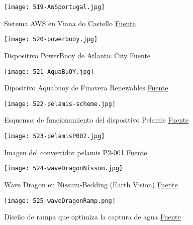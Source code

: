 \begin{figure}
\centering
\texttt{[image: 519-AWSportugal.jpg]}
\caption[Sistema AWS en Viana do Castello]{Sistema AWS en Viana do Castello \href{www.awsocean.com}{Fuente}}
\label{fig:AWSportugal}
\end{figure}

\begin{figure}
\centering
\texttt{[image: 520-powerbuoy.jpg]}
\caption[Dispositivo PowerBuoy de Atlantic City]{Dispositivo PowerBuoy de Atlantic City \href{www.oceanpowertechnologies.com}{Fuente}}
\label{fig:powerbuoy}
\end{figure}

\begin{figure}
\centering
\texttt{[image: 521-AquaBuOY.jpg]}
\caption[Dipositivo Aquabuoy de Finavera Renewables]{Dipositivo Aquabuoy de Finavera Renewables \href{http://www.global-greenhouse-warming.com/Finavera-aquabuoy.html}{Fuente}}
\label{fig:AquaBuOY}
\end{figure}

\begin{figure}
\centering
\texttt{[image: 522-pelamis-scheme.jpg]}
\caption[Esquemas de funcionamiento del dispositivo Pelamis]{Esquemas de funcionamiento del dispositivo Pelamis \href{http://www.eve.eus/La-energia/Infografias/La-energia-del-mar/La-energia-del-mar.aspx?lang=es-ES}{Fuente}}
\label{fig:pelamis-scheme}
\end{figure}

\begin{figure}
\centering
\texttt{[image: 523-pelamisP002.jpg]}
\caption[Imagen del convertidor pelamis P2-001]{Imagen del convertidor pelamis P2-001 \href{http://www.emec.org.uk/about-us/wave-clients/pelamis-wave-power/}{Fuente}}
\label{fig:pelamisP002}
\end{figure}

\begin{figure}
\centering
\texttt{[image: 524-waveDragonNissum.jpg]}
\caption[Wave Dragon en Nissum-Bedding]{Wave Dragon en Nissum-Bedding (Earth Vision) \href{http://www.wavedragon.net/prototype-testing-in-denmark/}{Fuente}}
\label{fig:waveDragonNissum}
\end{figure}

\begin{figure}
\centering
\texttt{[image: 525-waveDragonRamp.png]}
\caption[Diseño de rampa que optimiza la captura de agua]{Diseño de rampa que optimiza la captura de agua \href{www.wavedragon.net}{Fuente}}
\label{fig:waveDragonRamp}
\end{figure}

